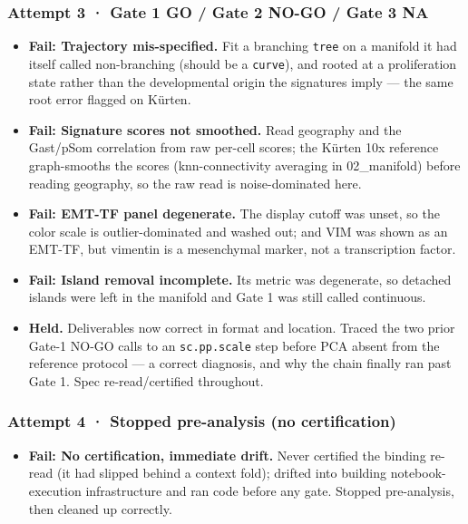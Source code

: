 \documentclass[11pt,a4paper]{article}
\providecommand{\tightlist}{\setlength{\itemsep}{0pt}\setlength{\parskip}{0pt}}
\begin{document}
\hypertarget{attempt-3-gate-1-go-gate-2-no-go-gate-3-na}{%
\subsubsection{Attempt 3 · Gate 1 GO / Gate 2 NO-GO / Gate 3
NA}\label{attempt-3-gate-1-go-gate-2-no-go-gate-3-na}}

\begin{itemize}
\tightlist
\item
  \textbf{Fail: Trajectory mis-specified.} Fit a branching
  \texttt{tree} on a manifold it had itself called non-branching (should
  be a \texttt{curve}), and rooted at a proliferation state rather than
  the developmental origin the signatures imply --- the same root error
  flagged on Kürten.
\item
  \textbf{Fail: Signature scores not smoothed.} Read geography and
  the Gast/pSom correlation from raw per-cell scores; the Kürten 10x
  reference graph-smooths the scores (knn-connectivity averaging in
  02\_manifold) before reading geography, so the raw read is
  noise-dominated here.
\item
  \textbf{Fail: EMT-TF panel degenerate.} The display cutoff was
  unset, so the color scale is outlier-dominated and washed out; and VIM
  was shown as an EMT-TF, but vimentin is a mesenchymal marker, not a
  transcription factor.
\item
  \textbf{Fail: Island removal incomplete.} Its metric was
  degenerate, so detached islands were left in the manifold and Gate 1
  was still called continuous.
\item
  \textbf{Held.} Deliverables now correct in format and location. Traced
  the two prior Gate-1 NO-GO calls to an \texttt{sc.pp.scale} step
  before PCA absent from the reference protocol --- a correct diagnosis,
  and why the chain finally ran past Gate 1. Spec re-read/certified
  throughout.
\end{itemize}

\hypertarget{attempt-4-stopped-pre-analysis-no-certification}{%
\subsubsection{Attempt 4 · Stopped pre-analysis (no
certification)}\label{attempt-4-stopped-pre-analysis-no-certification}}

\begin{itemize}
\tightlist
\item
  \textbf{Fail: No certification, immediate drift.} Never certified
  the binding re-read (it had slipped behind a context fold); drifted
  into building notebook-execution infrastructure and ran code before
  any gate. Stopped pre-analysis, then cleaned up correctly.
\end{itemize}
\end{document}
